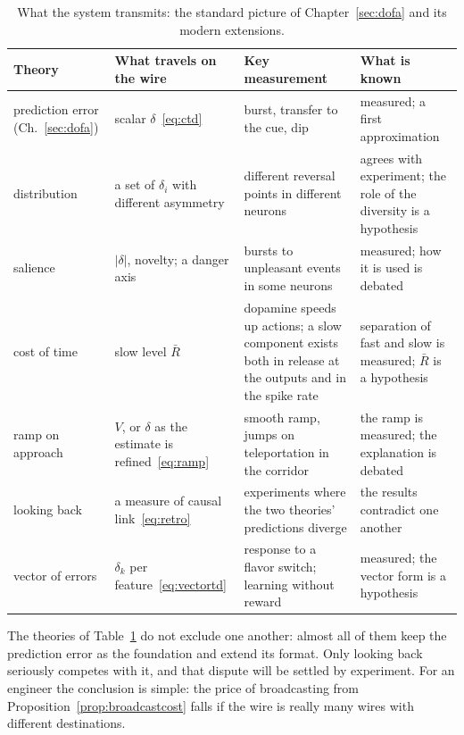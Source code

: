 \begin{table}[t]
\centering
\footnotesize
\setlength{\tabcolsep}{4pt}
\renewcommand{\arraystretch}{1.15}
\begin{tabular}{>{\raggedright}p{2.5cm}>{\raggedright}p{3.2cm}>{\raggedright}p{3.6cm}>{\raggedright\arraybackslash}p{4.2cm}}
\toprule
Theory & What travels on the wire & Key measurement & What is known \\
\midrule
prediction error (Ch.~\ref{sec:dofa}) & scalar $\delta$~\eqref{eq:ctd} & burst, transfer to the cue, dip & measured; a first approximation \\
distribution & a set of $\delta_i$ with different asymmetry & different reversal points in different neurons & agrees with experiment; the role of the diversity is a hypothesis \\
salience & $|\delta|$, novelty; a danger axis & bursts to unpleasant events in some neurons & measured; how it is used is debated \\
cost of time & slow level $\bar R$ & dopamine speeds up actions; a slow component exists both in release at the outputs and in the spike rate & separation of fast and slow is measured; $\bar R$ is a hypothesis \\
ramp on approach & $V$, or $\delta$ as the estimate is refined~\eqref{eq:ramp} & smooth ramp, jumps on teleportation in the corridor & the ramp is measured; the explanation is debated \\
looking back & a measure of causal link~\eqref{eq:retro} & experiments where the two theories' predictions diverge & the results contradict one another \\
vector of errors & $\delta_k$ per feature~\eqref{eq:vectortd} & response to a flavor switch; learning without reward & measured; the vector form is a hypothesis \\
\bottomrule
\end{tabular}
\caption{What the  system transmits: the standard picture of Chapter~\ref{sec:dofa} and its modern extensions.}
\label{tab:dofaalt}
\end{table}

The theories of Table~\ref{tab:dofaalt} do not exclude one another: almost all of them keep the prediction error as the foundation and extend its format. Only looking back seriously competes with it, and that dispute will be settled by experiment. For an engineer the conclusion is simple: the price of broadcasting from Proposition~\ref{prop:broadcastcost} falls if the wire is really many wires with different destinations.

